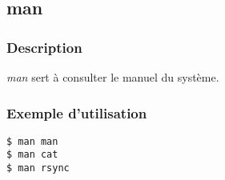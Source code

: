 \subsection*{man}
\subsubsection*{Description}
\emph{man} sert à consulter le manuel du système. 

\subsubsection*{Exemple d'utilisation}

\begin{lstlisting}
$ man man
$ man cat
$ man rsync
\end{lstlisting}
